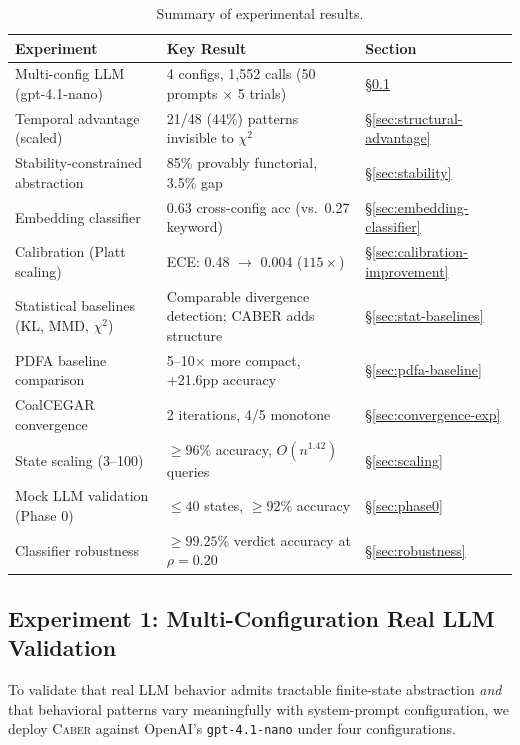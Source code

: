 \documentclass[11pt]{article}
\newcommand{\tool}{\textsc{Caber}}
\begin{document}
\begin{table}[t]
\centering
\caption{Summary of experimental results.}
\label{tab:results-summary}
\small
\begin{tabular}{@{}lll@{}}
\toprule
\textbf{Experiment} & \textbf{Key Result} & \textbf{Section} \\
\midrule
Multi-config LLM (gpt-4.1-nano) & 4 configs, 1{,}552 calls (50 prompts $\times$ 5 trials) & \S\ref{sec:real-llm} \\
Temporal advantage (scaled)      & 21/48 (44\%) patterns invisible to $\chi^2$ & \S\ref{sec:structural-advantage} \\
Stability-constrained abstraction & 85\% provably functorial, 3.5\% gap & \S\ref{sec:stability} \\
Embedding classifier            & 0.63 cross-config acc (vs.\ 0.27 keyword) & \S\ref{sec:embedding-classifier} \\
Calibration (Platt scaling)     & ECE: 0.48 $\to$ 0.004 ($115{\times}$) & \S\ref{sec:calibration-improvement} \\
Statistical baselines (KL, MMD, $\chi^2$) & Comparable divergence detection; CABER adds structure & \S\ref{sec:stat-baselines} \\
PDFA baseline comparison        & 5--10$\times$ more compact, +21.6pp accuracy & \S\ref{sec:pdfa-baseline} \\
CoalCEGAR convergence           & 2 iterations, 4/5 monotone & \S\ref{sec:convergence-exp} \\
State scaling (3--100)          & ${\ge}96\%$ accuracy, $O(n^{1.42})$ queries & \S\ref{sec:scaling} \\
Mock LLM validation (Phase 0)  & ${\le}40$ states, ${\ge}92\%$ accuracy & \S\ref{sec:phase0} \\
Classifier robustness           & ${\ge}99.25\%$ verdict accuracy at $\rho{=}0.20$ & \S\ref{sec:robustness} \\
\bottomrule
\end{tabular}
\end{table}

\subsection{Experiment 1: Multi-Configuration Real LLM Validation}\label{sec:real-llm}

To validate that real LLM behavior admits tractable finite-state
abstraction \emph{and} that behavioral patterns vary meaningfully
with system-prompt configuration, we deploy \tool{} against OpenAI's
\texttt{gpt-4.1-nano} under four configurations.
\end{document}
